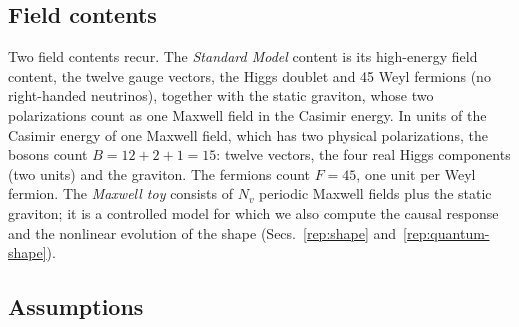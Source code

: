 \subsection{Field contents}
\label{rA:content}

Two field contents recur.
The \emph{Standard Model} content is its high-energy field content, the twelve gauge vectors, the Higgs doublet and 45 Weyl fermions (no right-handed neutrinos), together with the static graviton, whose two polarizations count as one Maxwell field in the Casimir energy. %
In units of the Casimir energy of one Maxwell field, which has two physical polarizations, the bosons count $B=12+2+1=15$: twelve vectors, the four real Higgs components (two units) and the graviton.
The fermions count $F=45$, one unit per Weyl fermion.
The \emph{Maxwell toy} consists of $N_v$ periodic Maxwell fields plus the static graviton; it is a controlled model for which we also compute the causal response and the nonlinear evolution of the shape (Secs.~\ref{rep:shape} and~\ref{rep:quantum-shape}).

\subsection{Assumptions}
\label{rA:assumptions}

